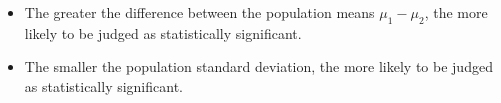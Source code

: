 \begin{itemize}
	\item The greater the difference between the population means $\mu_1 - \mu_2$, the more likely to be judged as statistically significant.
	\item The smaller the population standard deviation, the more likely to be judged as statistically significant.
\end{itemize}

